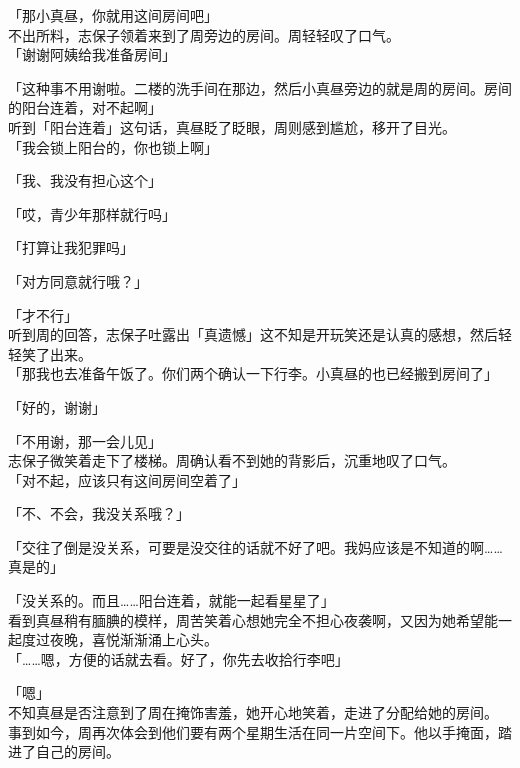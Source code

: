 「那小真昼，你就用这间房间吧」\\

不出所料，志保子领着来到了周旁边的房间。周轻轻叹了口气。\\

「谢谢阿姨给我准备房间」

「这种事不用谢啦。二楼的洗手间在那边，然后小真昼旁边的就是周的房间。房间的阳台连着，对不起啊」\\

听到「阳台连着」这句话，真昼眨了眨眼，周则感到尴尬，移开了目光。\\

「我会锁上阳台的，你也锁上啊」

「我、我没有担心这个」

「哎，青少年那样就行吗」

「打算让我犯罪吗」

「对方同意就行哦？」

「才不行」\\

听到周的回答，志保子吐露出「真遗憾」这不知是开玩笑还是认真的感想，然后轻轻笑了出来。\\

「那我也去准备午饭了。你们两个确认一下行李。小真昼的也已经搬到房间了」

「好的，谢谢」

「不用谢，那一会儿见」\\

志保子微笑着走下了楼梯。周确认看不到她的背影后，沉重地叹了口气。\\

「对不起，应该只有这间房间空着了」

「不、不会，我没关系哦？」

「交往了倒是没关系，可要是没交往的话就不好了吧。我妈应该是不知道的啊……真是的」

「没关系的。而且……阳台连着，就能一起看星星了」\\

看到真昼稍有腼腆的模样，周苦笑着心想她完全不担心夜袭啊，又因为她希望能一起度过夜晚，喜悦渐渐涌上心头。\\

「……嗯，方便的话就去看。好了，你先去收拾行李吧」

「嗯」\\

不知真昼是否注意到了周在掩饰害羞，她开心地笑着，走进了分配给她的房间。\\

事到如今，周再次体会到他们要有两个星期生活在同一片空间下。他以手掩面，踏进了自己的房间。\\

